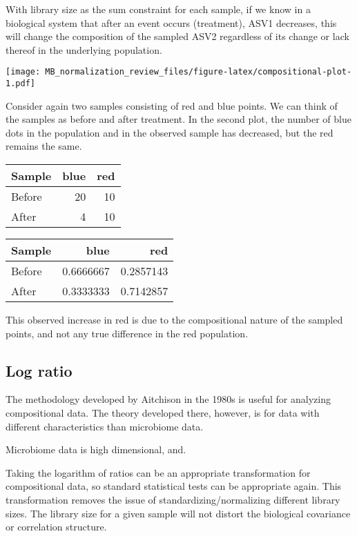 \documentclass[
]{book}
\begin{document}
With library size as the sum constraint for each sample, if we know in a biological system that after an event occurs (treatment), ASV1 decreases, this will change the composition of the sampled ASV2 regardless of its change or lack thereof in the underlying population.

\texttt{[image: MB\_normalization\_review\_files/figure-latex/compositional-plot-1.pdf]}

Consider again two samples consisting of red and blue points. We can think of the samples as before and after treatment. In the second plot, the number of blue dots in the population and in the observed sample has decreased, but the red remains the same.

\begin{tabular}{l|r|r}
\hline
Sample & blue & red\\
\hline
Before & 20 & 10\\
\hline
After & 4 & 10\\
\hline
\end{tabular}

\begin{tabular}{l|r|r}
\hline
Sample & blue & red\\
\hline
Before & 0.6666667 & 0.2857143\\
\hline
After & 0.3333333 & 0.7142857\\
\hline
\end{tabular}

This observed increase in red is due to the compositional nature of the sampled points, and not any true difference in the red population.

\hypertarget{log-ratio}{%
\subsection{Log ratio}\label{log-ratio}}

The methodology developed by Aitchison in the 1980s is useful for analyzing compositional data. The theory developed there, however, is for data with different characteristics than microbiome data.

Microbiome data is high dimensional, and.

Taking the logarithm of ratios can be an appropriate transformation for compositional data, so standard statistical tests can be appropriate again. This transformation removes the issue of standardizing/normalizing different library sizes. The library size for a given sample will not distort the biological covariance or correlation structure.
\end{document}
